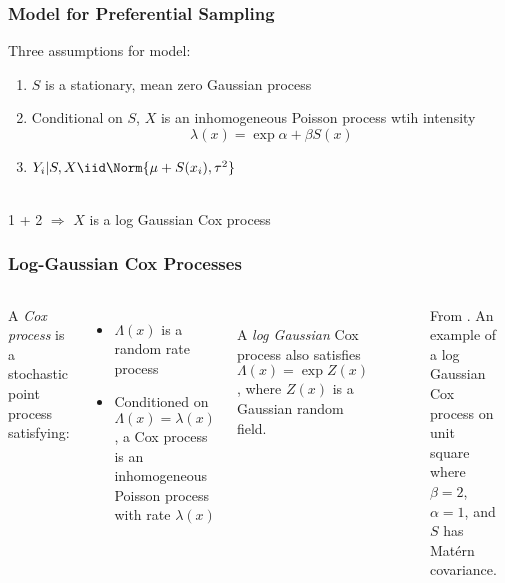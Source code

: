 \documentclass[xcolor=svgnames]{beamer}
\begin{document}
\begin{frame}
\frametitle{Model for Preferential Sampling}

Three assumptions for model:
\begin{enumerate}
\item $S$ is a stationary, mean zero Gaussian process
\item Conditional on $S$, $X$ is an inhomogeneous Poisson process wtih intensity
$$\lambda(x) = \exp{\alpha + \beta S(x)}$$
\item $Y_i \vert S, X \iid \Norm{\mu + S(x_i), \tau^2}$
\end{enumerate}
~\\
1 + 2 $\Rightarrow$ $X$ is a log Gaussian Cox process

\end{frame}
\begin{frame}
\frametitle{Log-Gaussian Cox Processes}

\begin{columns}[l]

\column{.05in}
\column{2.45in}
A \emph{Cox process} is a stochastic point process satisfying:
\begin{itemize}
\item $\Lambda(x)$ is a random rate process
\item Conditioned on $\Lambda(x) = \lambda(x)$, a Cox process is an inhomogeneous Poisson process with rate $\lambda(x)$
\end{itemize}
~\\
A \emph{log Gaussian} Cox process also satisfies $\Lambda(x) = \exp{Z(x)}$, where $Z(x)$ is a Gaussian random field.

\column{2.45in}

\begin{figure}
\centering
{}
\caption{From \citealt{diggle2010}.  An example of a log Gaussian Cox process on unit square where $\beta=2$, $\alpha=1$, and $S$ has Mat\'{e}rn covariance.}
\end{figure}

\column{.05in}

\end{columns}

\end{frame}
\end{document}
